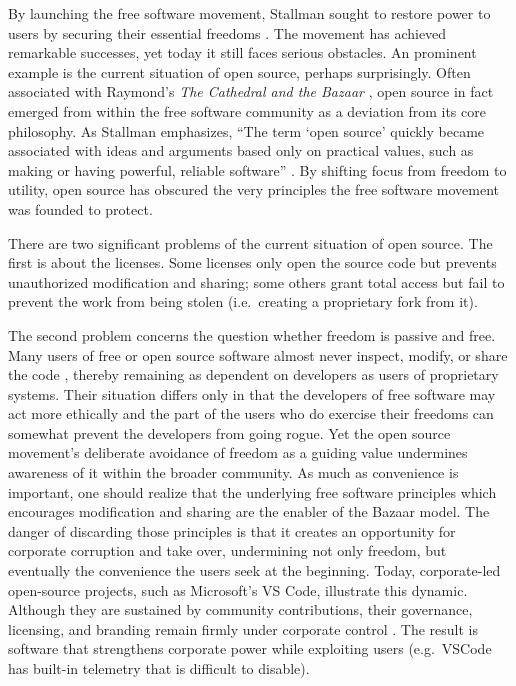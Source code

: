 \documentclass[10pt]{article}
\begin{document}
By launching the free software movement, Stallman sought to restore power to
users by securing their essential freedoms \cite[Essay~1]{stallman.essays}. The
movement has achieved remarkable successes, yet today it still faces serious
obstacles. An prominent example is the current situation of open source,
perhaps surprisingly. Often associated with Raymond’s \emph{The Cathedral and
the Bazaar} \cite{cathedral.bazaar}, open source in fact emerged from within
the free software community as a deviation from its core philosophy. As
Stallman emphasizes, ``The term `open source' quickly became associated with
ideas and arguments based only on practical values, such as making or having
powerful, reliable software'' \cite[Essay~14]{stallman.essays}. By shifting
focus from freedom to utility, open source has obscured the very principles the
free software movement was founded to protect.

There are two significant problems of the current situation of open source. The
first is about the licenses. Some licenses only open the source code but
prevents unauthorized modification and sharing; some others grant total
access but fail to prevent the work from being stolen (i.e.\ creating a
proprietary fork from it). 

The second problem concerns the question whether freedom is passive and free.
Many users of free or open source software almost never inspect, modify, or
share the code \cite{open.source.contrib}, thereby remaining as dependent on
developers as users of proprietary systems. Their situation differs only in
that the developers of free software may act more ethically and the part of the
users who do exercise their freedoms can somewhat prevent the developers from
going rogue. Yet the open source movement's deliberate avoidance of freedom as
a guiding value undermines awareness of it within the broader community.  As
much as convenience is important, one should realize that the underlying free
software principles which encourages modification and sharing are the enabler
of the Bazaar model. The danger of discarding those principles is that it
creates an opportunity for corporate corruption and take over, undermining not
only freedom, but eventually the convenience the users seek at the beginning.
Today, corporate-led open-source projects, such as Microsoft's VS Code,
illustrate this dynamic. Although they are sustained by community
contributions, their governance, licensing, and branding remain firmly under
corporate control \cite{corporate.open.source, fake.open.source}.  The result
is software that strengthens corporate power while exploiting users (e.g.\
VSCode has built-in telemetry that is difficult to disable). 
\end{document}
